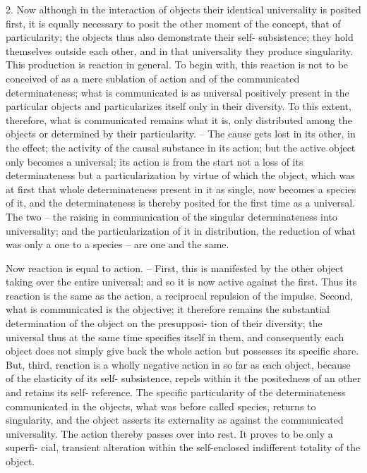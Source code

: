 2. Now although in the interaction of objects their identical universality
is posited first, it is equally necessary to posit the other moment of the
concept, that of particularity; the objects thus also demonstrate their self-
subsistence; they hold themselves outside each other, and in that universality
they produce singularity. This production is reaction in general. To begin
with, this reaction is not to be conceived of as a mere sublation of action
and of the communicated determinateness; what is communicated is as
universal positively present in the particular objects and particularizes itself
only in their diversity. To this extent, therefore, what is communicated
remains what it is, only distributed among the objects or determined by
their particularity. – The cause gets lost in its other, in the effect; the activity
of the causal substance in its action; but the active object only becomes a
universal; its action is from the start not a loss of its determinateness but
a particularization by virtue of which the object, which was at first that
whole determinateness present in it as single, now becomes a species of it, and
the determinateness is thereby posited for the first time as a universal. The
two – the raising in communication of the singular determinateness into
universality; and the particularization of it in distribution, the reduction
of what was only a one to a species – are one and the same.

Now reaction is equal to action. – First, this is manifested by the other
object taking over the entire universal; and so it is now active against the
first. Thus its reaction is the same as the action, a reciprocal repulsion of
the impulse. Second, what is communicated is the objective; it therefore
remains the substantial determination of the object on the presupposi-
tion of their diversity; the universal thus at the same time specifies itself
in them, and consequently each object does not simply give back the
whole action but possesses its specific share. But, third, reaction is a wholly
negative action in so far as each object, because of the elasticity of its self-
subsistence, repels within it the positedness of an other and retains its self-
reference. The specific particularity of the determinateness communicated
in the objects, what was before called species, returns to singularity, and
the object asserts its externality as against the communicated universality.
The action thereby passes over into rest. It proves to be only a superfi-
cial, transient alteration within the self-enclosed indifferent totality of the
object.

